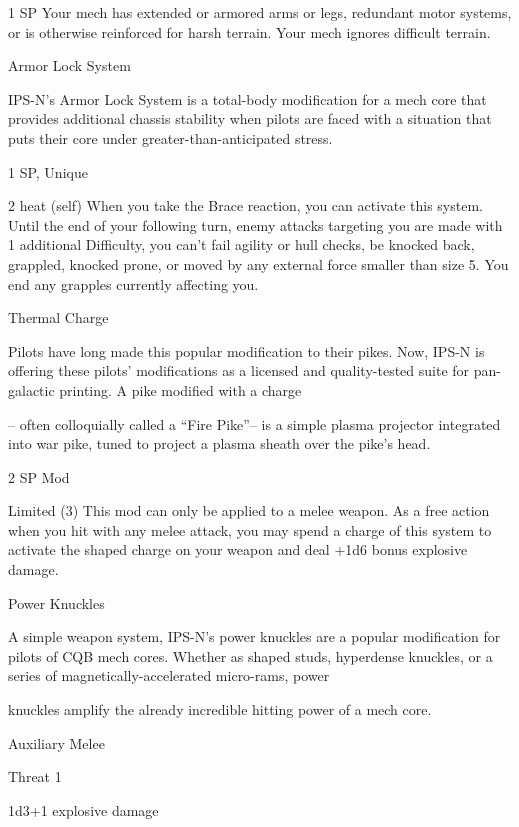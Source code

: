 1 SP  
Your mech has extended or armored arms or legs, redundant motor systems, or is otherwise  
reinforced for harsh terrain. Your mech ignores difficult terrain.
 

Armor Lock System  

IPS-N’s Armor Lock System is a total-body modification for a mech core that provides additional chassis  
stability when pilots are faced with a situation that puts their core under greater-than-anticipated stress.   

1 SP, Unique  

2 heat (self)  
When you take the Brace reaction, you can activate this system. Until the end of your following  
turn, enemy attacks targeting you are made with 1 additional Difficulty, you can’t fail agility or hull  
checks, be knocked back, grappled, knocked prone, or moved by any external force smaller  
than size 5. You end any grapples currently affecting you.
 

Thermal Charge  

Pilots have long made this popular modification to their pikes. Now, IPS-N is offering these pilots’  
modifications as a licensed and quality-tested suite for pan-galactic printing. A pike modified with a charge  

-- often colloquially called a “Fire Pike”-- is a simple plasma projector integrated into war pike, tuned to  
project a plasma sheath over the pike’s head.  

                                                                                                                      


2 SP  
Mod  

Limited (3)  
This mod can only be applied to a melee weapon. As a free action when you hit with any melee  
attack, you may spend a charge of this system to activate the shaped charge on your weapon  
and deal +1d6 bonus explosive damage.
 

Power Knuckles  

A simple weapon system, IPS-N’s power knuckles are a popular modification for pilots of CQB mech cores.  
Whether as shaped studs, hyperdense knuckles, or a series of magnetically-accelerated micro-rams, power  

knuckles amplify the already incredible hitting power of a mech core.   

Auxiliary Melee
 
Threat 1
 
1d3+1 explosive damage
 

